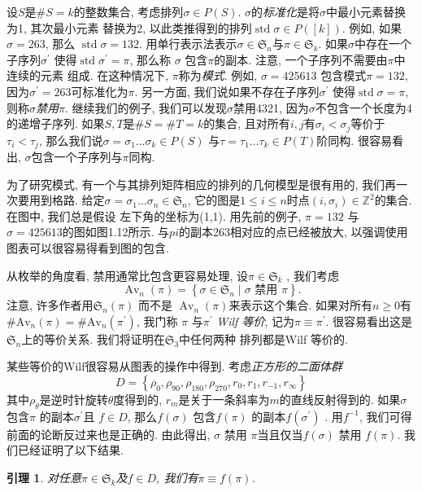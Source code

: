 \documentclass{ctexbook}
\newtheorem{lem}[thm]{引理}
\begin{document}
设$S$是$\# S=k$的整数集合, 考虑排列$\sigma \in P(S)$. $\sigma$的\textsl{标准化}是将$\sigma$中最小元素替换为1, 其次最小元素
替换为2, 以此类推得到的排列$\operatorname{std} \sigma \in P([k])$. 例如, 如果 $\sigma=263$, 那么 $\operatorname{std} \sigma=132$.
用单行表示法表示$\sigma \in \mathfrak{S}_{n}$与$\pi \in \mathfrak{S}_{k}$. 如果$\sigma$中存在一个子序列$\sigma^{\prime}$
使得$\operatorname{std} \sigma^{\prime}=\pi $, 那么称 $\sigma$ 包含$\pi$的副本. 注意, 一个子序列不需要由$\pi$中连续的元素
组成. 在这种情况下, $\pi$称为\textsl{模式}. 例如, $\sigma=425613$ 包含模式$\pi=132$, 因为$\sigma^{\prime}=263$可标准化为$\pi$.
另一方面, 我们说如果不存在子序列$\sigma^{\prime}$ 使得$\operatorname{std} \sigma=\pi$, 则称$\sigma$\textsl{禁用}$\pi$.
继续我们的例子, 我们可以发现$\sigma$禁用4321, 因为$\sigma$不包含一个长度为4的递增子序列. 如果$S, T$是$\# S=\# T=k$的集合,
且对所有$i, j$有$\sigma_{i}<\sigma_{j}$等价于 $\tau_{i}<\tau_{j}$, 那么我们说$\sigma=\sigma_{1} \ldots \sigma_{k} \in P(S)$
与$\tau=\tau_{1} \ldots \tau_{k} \in P(T)$阶同构. 很容易看出, $\sigma$包含一个子序列与$\pi$同构.

为了研究模式, 有一个与其排列矩阵相应的排列的几何模型是很有用的, 我们再一次要用到格路. 给定$\sigma=\sigma_{1} \ldots \sigma_{n} \in \mathfrak{S}_{n}$,
它的图是$1 \leqslant i \leqslant n $时点$\left(i, \sigma_{i}\right) \in \mathbb{Z}^{2}$的集合. 在图中, 我们总是假设
左下角的坐标为(1,1). 用先前的例子, $\pi=132$ 与 $\sigma=425613$的图如图1.12所示. 与$pi$的副本263相对应的点已经被放大,
以强调使用图表可以很容易得看到图的包含.

从枚举的角度看, 禁用通常比包含更容易处理, 设$\pi \in \mathfrak{S}_{k}$ , 我们考虑
$$
\operatorname{Av}_{n}(\pi)=\left\{\sigma \in \mathfrak{S}_{n} \mid \sigma \text { 禁用 } \pi\right\}.
$$
注意, 许多作者用$\mathfrak{S}_{n}(\pi)$ 而不是 $\operatorname{Av}_{n}(\pi)$来表示这个集合. 如果对所有$n \geqslant 0$有
$\# \mathrm{Av}_{n}(\pi)=\# \mathrm{Av}_{n}\left(\pi^{\prime}\right)$, 我门称 $\pi$ 与$\pi^{\prime}$ \textsl{Wilf 等价},
记为$\pi \equiv \pi^{\prime}$. 很容易看出这是$\mathfrak{S}_{n}$上的等价关系. 我们将证明在$\mathfrak{S}_{3}$中任何两种
排列都是Wilf 等价的.

某些等价的Wilf很容易从图表的操作中得到. 考虑\textsl{正方形的二面体群}
\begin{equation}
    D=\left\{\rho_{0}, \rho_{90}, \rho_{180}, \rho_{270}, r_{0}, r_{1}, r_{-1}, r_{\infty}\right\}
\end{equation}
其中$\rho_{\theta}$是逆时针旋转$\theta$度得到的, $r_{m}$是关于一条斜率为$m$的直线反射得到的. 如果$\sigma$包含$\pi$
的副本$\sigma^{\prime}$且 $f \in D$, 那么$f(\sigma)$ 包含$f(\pi)$ 的副本$f\left(\sigma^{\prime}\right)$ . 用$f^{-1}$,
我们可得前面的论断反过来也是正确的. 由此得出, $\sigma$ 禁用 $\pi$当且仅当$f(\sigma)$ 禁用 $f(\pi)$. 我们已经证明了以下结果.
     \begin{lem}
     	对任意$\pi \in \mathfrak{S}_{k}$及$f \in D$, 我们有$\pi \equiv f(\pi) $.
     \end{lem}
\end{document}
